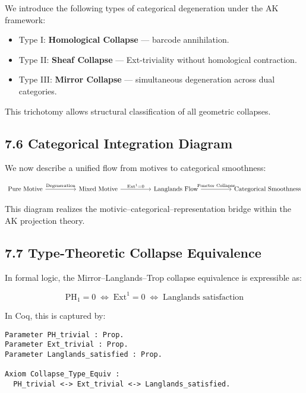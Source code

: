 \documentclass[11pt]{article}
\begin{document}
We introduce the following types of categorical degeneration under the AK framework:

\begin{itemize}
  \item Type I: \textbf{Homological Collapse} — barcode annihilation.
  \item Type II: \textbf{Sheaf Collapse} — Ext-triviality without homological contraction.
  \item Type III: \textbf{Mirror Collapse} — simultaneous degeneration across dual categories.
\end{itemize}

This trichotomy allows structural classification of all geometric collapses.

\subsection*{7.6 Categorical Integration Diagram}

We now describe a unified flow from motives to categorical smoothness:

\[
\begin{tikzcd}[column sep=huge, row sep=large]
\text{Pure Motive} \arrow[r, "\text{Degeneration}"]
& \text{Mixed Motive} \arrow[r, "\mathrm{Ext}^1 = 0"]
& \text{Langlands Flow} \arrow[r, "\text{Functor Collapse}"]
& \text{Categorical Smoothness}
\end{tikzcd}
\]

This diagram realizes the motivic–categorical–representation bridge within the AK projection theory.

\subsection*{7.7 Type-Theoretic Collapse Equivalence}

In formal logic, the Mirror–Langlands–Trop collapse equivalence is expressible as:

\[
\text{PH}_1 = 0 \;\Leftrightarrow\; \mathrm{Ext}^1 = 0 \;\Leftrightarrow\; \text{Langlands satisfaction}
\]

In Coq, this is captured by:

\begin{lstlisting}[language=Coq]
Parameter PH_trivial : Prop.
Parameter Ext_trivial : Prop.
Parameter Langlands_satisfied : Prop.

Axiom Collapse_Type_Equiv :
  PH_trivial <-> Ext_trivial <-> Langlands_satisfied.
\end{lstlisting}
\end{document}
